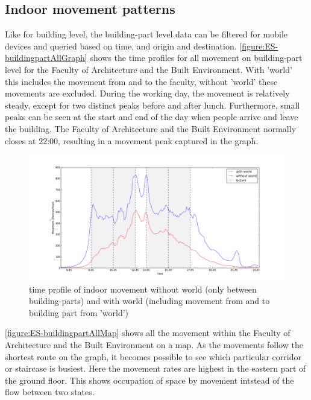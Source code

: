 \subsection{Indoor movement patterns}\label{ES-indoorMovement}
Like for building level, the building-part level data can be filtered for mobile devices and queried based on time, and origin and destination. \autoref{figure:ES-buildingpartAllGraph} shows the time profiles for all movement on building-part level for the Faculty of Architecture and the Built Environment. With 'world' this includes the movement from and to the faculty, without 'world' these movements are excluded. During the working day, the movement is relatively steady, except for two distinct peaks before and after lunch. Furthermore, small peaks can be seen at the start and end of the day when people arrive and leave the building. The Faculty of Architecture and the Built Environment normally closes at 22:00, resulting in a movement peak captured in the graph. 

\begin{figure}[H]
\centering
\includegraphics[scale=0.2]{buildingpart_all_graph.png}
\captionsetup{justification=centering}
\caption{time profile of indoor movement without world (only between building-parts) and with world (including movement from and to building part from 'world')}
\label{figure:ES-buildingpartAllGraph}
\end{figure}

\autoref{figure:ES-buildingpartAllMap} shows all the movement within the Faculty of Architecture and the Built Environment on a map. As the movements follow the shortest route on the graph, it becomes possible to see which particular corridor or staircase is busiest. Here the movement rates are highest in the eastern part of the ground floor. This shows occupation of space by movement intstead of the flow between two states.


